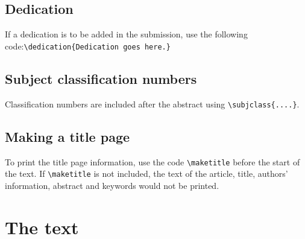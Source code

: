 \documentclass{OUP-EJ}
\begin{document}
\subsection{Dedication}
If a dedication is to be added in the submission, use the following code:\newline \verb+\dedication{Dedication goes here.}+


\subsection{Subject classification numbers}
Classification numbers are included after the abstract using \verb"\subjclass{....}".



\subsection{Making a  title page}
To print the title page information, use the code \verb"\maketitle"  before the start of the text.
If \verb"\maketitle" is not included, the text of the
article, title, authors' information, abstract and keywords would not be printed.

\section{The text}
\end{document}
